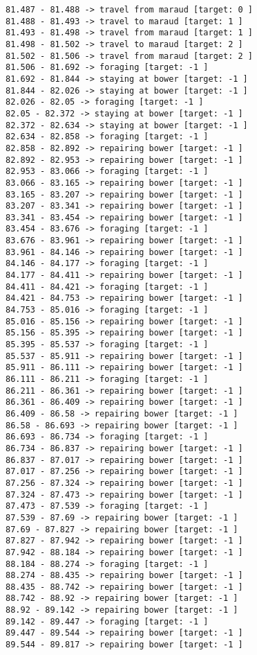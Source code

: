 \documentclass[11pt]{article}
\begin{document}
\begin{Verbatim}[commandchars=\\\{\}]
81.487 - 81.488 -> travel from maraud [target: 0 ]
81.488 - 81.493 -> travel to maraud [target: 1 ]
81.493 - 81.498 -> travel from maraud [target: 1 ]
81.498 - 81.502 -> travel to maraud [target: 2 ]
81.502 - 81.506 -> travel from maraud [target: 2 ]
81.506 - 81.692 -> foraging [target: -1 ]
81.692 - 81.844 -> staying at bower [target: -1 ]
81.844 - 82.026 -> staying at bower [target: -1 ]
82.026 - 82.05 -> foraging [target: -1 ]
82.05 - 82.372 -> staying at bower [target: -1 ]
82.372 - 82.634 -> staying at bower [target: -1 ]
82.634 - 82.858 -> foraging [target: -1 ]
82.858 - 82.892 -> repairing bower [target: -1 ]
82.892 - 82.953 -> repairing bower [target: -1 ]
82.953 - 83.066 -> foraging [target: -1 ]
83.066 - 83.165 -> repairing bower [target: -1 ]
83.165 - 83.207 -> repairing bower [target: -1 ]
83.207 - 83.341 -> repairing bower [target: -1 ]
83.341 - 83.454 -> repairing bower [target: -1 ]
83.454 - 83.676 -> foraging [target: -1 ]
83.676 - 83.961 -> repairing bower [target: -1 ]
83.961 - 84.146 -> repairing bower [target: -1 ]
84.146 - 84.177 -> foraging [target: -1 ]
84.177 - 84.411 -> repairing bower [target: -1 ]
84.411 - 84.421 -> foraging [target: -1 ]
84.421 - 84.753 -> repairing bower [target: -1 ]
84.753 - 85.016 -> foraging [target: -1 ]
85.016 - 85.156 -> repairing bower [target: -1 ]
85.156 - 85.395 -> repairing bower [target: -1 ]
85.395 - 85.537 -> foraging [target: -1 ]
85.537 - 85.911 -> repairing bower [target: -1 ]
85.911 - 86.111 -> repairing bower [target: -1 ]
86.111 - 86.211 -> foraging [target: -1 ]
86.211 - 86.361 -> repairing bower [target: -1 ]
86.361 - 86.409 -> repairing bower [target: -1 ]
86.409 - 86.58 -> repairing bower [target: -1 ]
86.58 - 86.693 -> repairing bower [target: -1 ]
86.693 - 86.734 -> foraging [target: -1 ]
86.734 - 86.837 -> repairing bower [target: -1 ]
86.837 - 87.017 -> repairing bower [target: -1 ]
87.017 - 87.256 -> repairing bower [target: -1 ]
87.256 - 87.324 -> repairing bower [target: -1 ]
87.324 - 87.473 -> repairing bower [target: -1 ]
87.473 - 87.539 -> foraging [target: -1 ]
87.539 - 87.69 -> repairing bower [target: -1 ]
87.69 - 87.827 -> repairing bower [target: -1 ]
87.827 - 87.942 -> repairing bower [target: -1 ]
87.942 - 88.184 -> repairing bower [target: -1 ]
88.184 - 88.274 -> foraging [target: -1 ]
88.274 - 88.435 -> repairing bower [target: -1 ]
88.435 - 88.742 -> repairing bower [target: -1 ]
88.742 - 88.92 -> repairing bower [target: -1 ]
88.92 - 89.142 -> repairing bower [target: -1 ]
89.142 - 89.447 -> foraging [target: -1 ]
89.447 - 89.544 -> repairing bower [target: -1 ]
89.544 - 89.817 -> repairing bower [target: -1 ]

\end{Verbatim}
\end{document}
